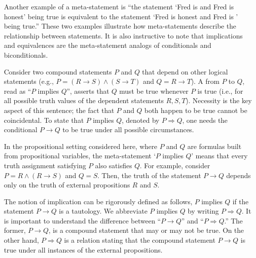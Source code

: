 Another example of a meta-statement is ``the statement `Fred is \mascot and Fred is honest' being true is equivalent to the statement `Fred is honest and Fred is \mascot' being true.''
These two examples illustrate how meta-statements describe the relationship between statements.
It is also instructive to note that implications and equivalences are the meta-statement analogs of conditionals and biconditionals.

Consider two compound statements $P$ and $Q$ that depend on other logical statements (e.g., $P = (R \to S) \wedge (S \to T)$ and $Q = R \to T$).
A  from $P$ to $Q$, read as ``$P$ implies $Q$'',  asserts that $Q$ must be true whenever $P$ is true (i.e., for all possible truth values of the dependent statements $R,S,T$).
Necessity is the key aspect of this sentence; the fact that $P$ and $Q$ both happen to be true cannot be coincidental.
To state that $P$ implies $Q$, denoted by $P \Rightarrow Q$, one needs the conditional $P \rightarrow Q$ to be true under all possible circumstances.

In the propositional setting considered here, where $P$ and $Q$ are formulas built from propositional variables, the meta-statement `$P$ implies $Q$' means that every truth assignment satisfying $P$ also satisfies $Q$.
For example, consider $P=R \wedge (R \to S)$ and $Q=S$.
Then, the truth of the statement $P \to Q$ depends only on the truth of external propositions $R$ and $S$.

The notion of implication can be rigorously defined as follows, $P$ implies $Q$ if the statement $P \rightarrow Q$ is a tautology.
We abbreviate $P$ implies $Q$ by writing $P \Rightarrow Q$.
It is important to understand the difference between ``$P \rightarrow Q$'' and ``$P \Rightarrow Q$.''
The former, $P \rightarrow Q$, is a compound statement that may or may not be true.
On the other hand, $P \Rightarrow Q$ is a relation stating that the compound statement $P \rightarrow Q$ is true under all instances of the external propositions.

